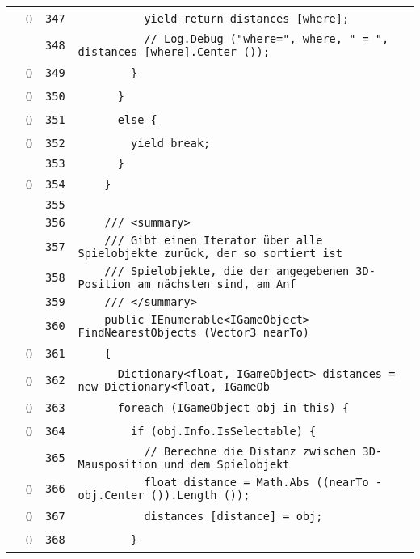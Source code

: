 \documentclass[a4paper,10pt]{article}
\begin{document}
\begin{longtable}[l]{lrrl}
\cellcolor{red} & 0 & \verb~347~ & \verb~          yield return distances [where];~\\
\cellcolor{gray} &  & \verb~348~ & \verb~          // Log.Debug ("where=", where, " = ", distances [where].Center ());~\\
\cellcolor{red} & 0 & \verb~349~ & \verb~        }~\\
\cellcolor{red} & 0 & \verb~350~ & \verb~      }~\\
\cellcolor{red} & 0 & \verb~351~ & \verb~      else {~\\
\cellcolor{red} & 0 & \verb~352~ & \verb~        yield break;~\\
\cellcolor{gray} &  & \verb~353~ & \verb~      }~\\
\cellcolor{red} & 0 & \verb~354~ & \verb~    }~\\
\cellcolor{gray} &  & \verb~355~ & \verb~~\\
\cellcolor{gray} &  & \verb~356~ & \verb~    /// <summary>~\\
\cellcolor{gray} &  & \verb~357~ & \verb~    /// Gibt einen Iterator über alle Spielobjekte zurück, der so sortiert ist~\\
\cellcolor{gray} &  & \verb~358~ & \verb~    /// Spielobjekte, die der angegebenen 3D-Position am nächsten sind, am Anf~\\
\cellcolor{gray} &  & \verb~359~ & \verb~    /// </summary>~\\
\cellcolor{gray} &  & \verb~360~ & \verb~    public IEnumerable<IGameObject> FindNearestObjects (Vector3 nearTo)~\\
\cellcolor{red} & 0 & \verb~361~ & \verb~    {~\\
\cellcolor{red} & 0 & \verb~362~ & \verb~      Dictionary<float, IGameObject> distances = new Dictionary<float, IGameOb~\\
\cellcolor{red} & 0 & \verb~363~ & \verb~      foreach (IGameObject obj in this) {~\\
\cellcolor{red} & 0 & \verb~364~ & \verb~        if (obj.Info.IsSelectable) {~\\
\cellcolor{gray} &  & \verb~365~ & \verb~          // Berechne die Distanz zwischen 3D-Mausposition und dem Spielobjekt~\\
\cellcolor{red} & 0 & \verb~366~ & \verb~          float distance = Math.Abs ((nearTo - obj.Center ()).Length ());~\\
\cellcolor{red} & 0 & \verb~367~ & \verb~          distances [distance] = obj;~\\
\cellcolor{red} & 0 & \verb~368~ & \verb~        }~\\

\end{longtable}
\end{document}
